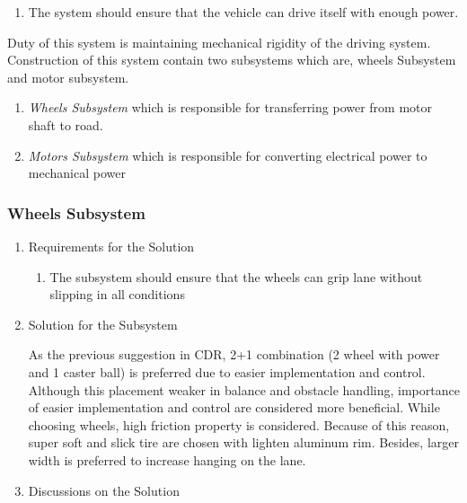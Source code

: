 \documentclass[a4paper,12pt]{article}
\begin{document}
\begin{enumerate}
		\begin{enumerate}
			\item The system should ensure that the vehicle can drive itself with enough power.	
\end{enumerate}	
		
		Duty of this system is maintaining mechanical rigidity of the driving system. Construction of this system contain two subsystems which are, wheels Subsystem and motor subsystem.
			
			\begin{enumerate}
				\item \textit{Wheels Subsystem} which is responsible for transferring power from motor shaft to road.
				\item \textit{Motors Subsystem} which is responsible for converting electrical power to mechanical power
			\end{enumerate}
		
	\subsubsection{Wheels Subsystem}
	
		\begin{enumerate}
			\item {Requirements for the Solution}
			
			\begin{enumerate}
					\item The subsystem should ensure that the wheels can grip lane without slipping in all conditions 
				\end{enumerate}
	
	
			\item {Solution for the Subsystem}
			
			As the previous suggestion in CDR, 2+1 combination (2 wheel with power and 1 caster ball) is preferred due to easier implementation and control. Although this placement weaker in balance and obstacle handling, importance of easier implementation and control are considered more beneficial. 
While choosing wheels, high friction property is considered. Because of this reason, super soft and slick tire are chosen with lighten aluminum rim. Besides, larger width is preferred to increase hanging on the lane.      

			
			\item {Discussions on the Solution}
			
		
\end{enumerate}
		

\end{enumerate}
\end{document}

